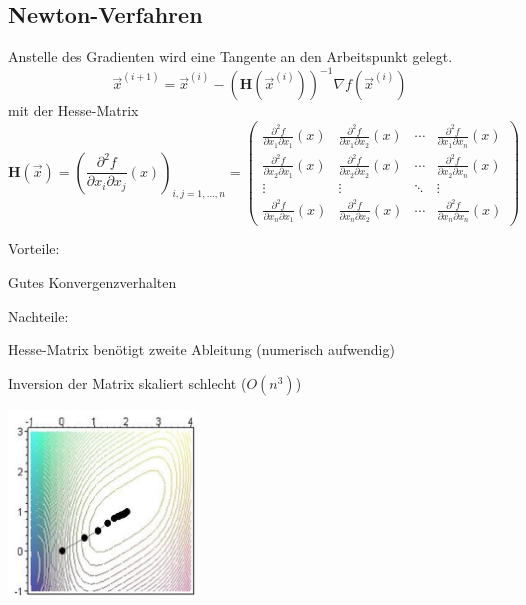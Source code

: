 \subsection{Newton-Verfahren}
  \begin{minipage}{14cm}
    Anstelle des Gradienten wird eine Tangente an den Arbeitspunkt gelegt.
    $$\vec{x}^{(i+1)} = \vec{x}^{(i)} - \left(\bm H(\vec{x}^{(i)})\right)^{-1} \nabla f(\vec{x}^{(i)})$$
    mit der Hesse-Matrix
    $$\bm{H}(\vec{x})=
    \left(\frac{\partial^2f}{\partial x_i\partial x_j}(x)\right)_{i,j=1,\dots, n}=
    \begin{pmatrix}
    \frac{\partial^2 f}{\partial x_1\partial x_1}(x)&\frac{\partial^2 f}{\partial x_1\partial x_2}(x)&\cdots&\frac{\partial^2  f}{\partial x_1\partial x_n}(x)\\[0.5em]
    \frac{\partial^2 f}{\partial x_2\partial x_1}(x)&\frac{\partial^2 f}{\partial x_2\partial x_2}(x)&\cdots&\frac{\partial^2  f}{\partial x_2\partial x_n}(x)\\
    \vdots&\vdots&\ddots&\vdots\\
    \frac{\partial^2 f}{\partial x_n\partial x_1}(x)&\frac{\partial^2 f}{\partial x_n\partial x_2}(x)&\cdots&\frac{\partial^2  f}{\partial x_n\partial x_n}(x)
    \end{pmatrix}$$
    
    Vorteile:
    \begin{liste}
      \item Gutes Konvergenzverhalten
    \end{liste}
    
    Nachteile:
    \begin{liste}
      \item Hesse-Matrix benötigt zweite Ableitung (numerisch aufwendig)
      \item Inversion der Matrix skaliert schlecht ($O(n^3)$)
    \end{liste}
  \end{minipage}
  \begin{minipage}{5cm}
    \includegraphics[width=5cm]{./Content/NonLinearOptimization/newton}
  \end{minipage}
  
